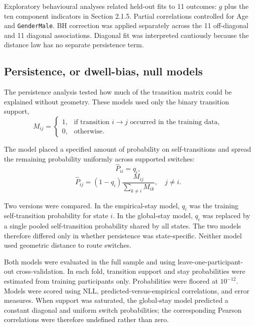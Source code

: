 \documentclass[12pt,a4paper]{report}
\begin{document}
Exploratory behavioural analyses related held-out fits to 11 outcomes: $g$ plus the ten component indicators in Section 2.1.5. Partial correlations controlled for Age and \texttt{GenderMale}. BH correction was applied separately across the 11 off-diagonal and 11 diagonal associations. Diagonal fit was interpreted cautiously because the distance law has no separate persistence term.

\subsection{Persistence, or dwell-bias, null models}

The persistence analysis tested how much of the transition matrix could be explained without geometry. These models used only the binary transition support,
\begin{equation}
M_{ij}
=
\begin{cases}
1, & \text{if transition } i \rightarrow j \text{ occurred in the training data},\\
0, & \text{otherwise}.
\end{cases}
\end{equation}

The model placed a specified amount of probability on self-transitions and spread the remaining probability uniformly across supported switches:
\begin{equation}
\hat{P}_{ii}=q_i,
\end{equation}
\begin{equation}
\hat{P}_{ij}
=
(1-q_i)
\frac{M_{ij}}
{\sum_{k\neq i}M_{ik}},
\quad j\neq i.
\end{equation}

Two versions were compared. In the empirical-stay model, $q_i$ was the training self-transition probability for state $i$. In the global-stay model, $q_i$ was replaced by a single pooled self-transition probability shared by all states. The two models therefore differed only in whether persistence was state-specific. Neither model used geometric distance to route switches.

Both models were evaluated in the full sample and using leave-one-participant-out cross-validation. In each fold, transition support and stay probabilities were estimated from training participants only. Probabilities were floored at $10^{-12}$. Models were scored using NLL, predicted-versus-empirical correlations, and error measures. When support was saturated, the global-stay model predicted a constant diagonal and uniform switch probabilities; the corresponding Pearson correlations were therefore undefined rather than zero.
\end{document}
